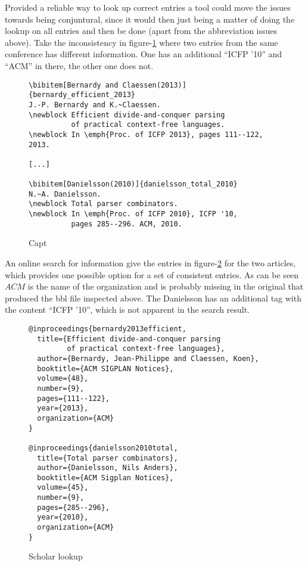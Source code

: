 
Provided a reliable way to look up correct entries a tool could move
the issues towards being conjuntural, since it would then just being a
matter of doing the lookup on all entries and then be done (apart from
the abbreviation issues above).  Take the inconsistency in
figure-\ref{fig:inconsistent_proceedings} where two entries from the
same conference has different information.  One has an additional
``ICFP '10'' and ``ACM'' in there, the other one does not.

\begin{figure}[ht]
  \centering
  \begin{small}
\begin{verbatim}
\bibitem[Bernardy and Claessen(2013)]{bernardy_efficient_2013}
J.-P. Bernardy and K.~Claessen.
\newblock Efficient divide-and-conquer parsing 
          of practical context-free languages.
\newblock In \emph{Proc. of ICFP 2013}, pages 111--122, 2013.

[...]

\bibitem[Danielsson(2010)]{danielsson_total_2010}
N.~A. Danielsson.
\newblock Total parser combinators.
\newblock In \emph{Proc. of ICFP 2010}, ICFP '10,
          pages 285--296. ACM, 2010.
\end{verbatim}
  \end{small}
  \caption{Capt}
\label{fig:inconsistent_proceedings}
\end{figure}

An online search for {\bibtex} information give the entries in
figure-\ref{fig:missing_org_scholar_lookup} for the two articles,
which provides one possible option for a set of consistent entries.
As can be seen $ACM$ is the name of the organization and is probably
missing in the original {\bibtex} that produced the bbl file inspected
above.  The Danielsson has an additional tag with the content ``ICFP
'10'', which is not apparent in the search result.

\begin{figure}[ht]
  \centering
\begin{verbatim}
@inproceedings{bernardy2013efficient,
  title={Efficient divide-and-conquer parsing
         of practical context-free languages},
  author={Bernardy, Jean-Philippe and Claessen, Koen},
  booktitle={ACM SIGPLAN Notices},
  volume={48},
  number={9},
  pages={111--122},
  year={2013},
  organization={ACM}
}

@inproceedings{danielsson2010total,
  title={Total parser combinators},
  author={Danielsson, Nils Anders},
  booktitle={ACM Sigplan Notices},
  volume={45},
  number={9},
  pages={285--296},
  year={2010},
  organization={ACM}
}
\end{verbatim}
  \caption{Scholar lookup}
\label{fig:missing_org_scholar_lookup}
\end{figure}

